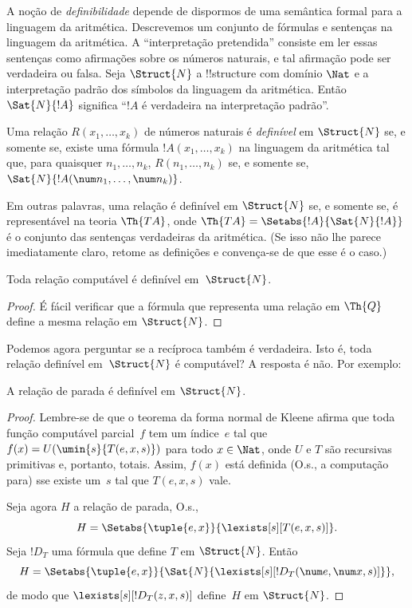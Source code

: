 \documentclass[../../../include/open-logic-section]{subfiles}
\begin{document}


A noção de \emph{definibilidade} depende de dispormos de uma semântica
formal para a linguagem da aritmética. Descrevemos um conjunto de fórmulas e
sentenças na linguagem da aritmética. A ``interpretação pretendida''
consiste em ler essas sentenças como afirmações sobre os números naturais, e
tal afirmação pode ser verdadeira ou falsa. Seja $\Struct{N}$ a
!!{structure} com domínio $\Nat$ e a interpretação padrão dos símbolos da
linguagem da aritmética. Então $\Sat{N}{!A}$ significa ``$!A$ é verdadeira
na interpretação padrão''.

\begin{defn}
Uma relação $R(x_1,\dots,x_k)$ de números naturais é \emph{definível} em
$\Struct{N}$ se, e somente se, existe uma fórmula $!A(x_1,\dots,x_k)$ na
linguagem da aritmética tal que, para quaisquer $n_1,\dots,n_k$,
$R(n_1,\dots,n_k)$ se, e somente se,
$\Sat{N}{!A(\num n_1,\dots,\num n_k)}$.
\end{defn}

Em outras palavras, uma relação é definível em $\Struct{N}$ se, e somente
se, é representável na teoria $\Th{TA}$, onde $\Th{TA} =
\Setabs{!A}{\Sat{N}{!A}}$ é o conjunto das sentenças verdadeiras da
aritmética. (Se isso não lhe parece imediatamente claro, retome as
definições e convença-se de que esse é o caso.)

\begin{lem}
Toda relação computável é definível em~$\Struct{N}$.
\end{lem}

\begin{proof}
É fácil verificar que a fórmula que representa uma relação em $\Th{Q}$
define a mesma relação em $\Struct{N}$.
\end{proof}

Podemos agora perguntar se a recíproca também é verdadeira. Isto é, toda
relação definível em~$\Struct{N}$ é computável? A resposta é não. Por
exemplo:

\begin{lem}
A relação de parada é definível em $\Struct{N}$.
\end{lem}

\begin{proof}
Lembre-se de que o teorema da forma normal de Kleene afirma que toda função
computável parcial~$f$ tem um índice~$e$ tal que $f(x) =
U(\umin{s}{T(e,x,s)})$ para todo $x \in \Nat$, onde $U$ e $T$ são
recursivas primitivas e, portanto, totais. Assim, $f(x)$ está definida (O.s.\@, a computação para) sse existe um~$s$ tal que $T(e,x,s)$ vale.

Seja agora $H$ a relação de parada, O.s.\@,
\[
H = \Setabs{\tuple{e,x}}{\lexists[s][T(e, x, s)]}.
\]
Seja $!D_T$ uma fórmula que define $T$ em $\Struct{N}$. Então
\[
H = \Setabs{\tuple{e,x}}{\Sat{N}{\lexists[s][!D_T(\num e, \num x, s)]}},
\]
de modo que $\lexists[s][!D_T(z, x, s)]$ define~$H$ em $\Struct{N}$.
\end{proof}
\end{document}
